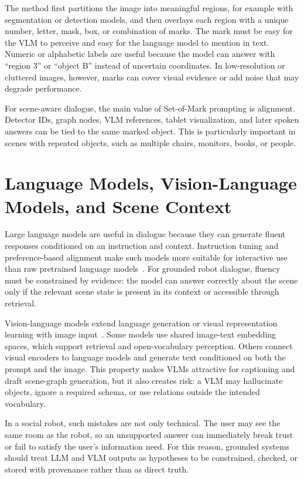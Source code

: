 The method first partitions the image into meaningful regions, for example with segmentation or detection models, and then overlays each region with a unique number, letter, mask, box, or combination of marks. The mark must be easy for the VLM to perceive and easy for the language model to mention in text. Numeric or alphabetic labels are useful because the model can answer with \enquote{region 3} or \enquote{object B} instead of uncertain coordinates. In low-resolution or cluttered images, however, marks can cover visual evidence or add noise that may degrade performance.

For scene-aware dialogue, the main value of Set-of-Mark prompting is alignment. Detector IDs, graph nodes, VLM references, tablet visualization, and later spoken answers can be tied to the same marked object. This is particularly important in scenes with repeated objects, such as multiple chairs, monitors, books, or people.

\section{Language Models, Vision-Language Models, and Scene Context}\label{sec:llms-vlms-context}

Large language models are useful in dialogue because they can generate fluent responses conditioned on an instruction and context. Instruction tuning and preference-based alignment make such models more suitable for interactive use than raw pretrained language models~\cite{ouyang2022traininglanguagemodelsfollow}. For grounded robot dialogue, fluency must be constrained by evidence: the model can answer correctly about the scene only if the relevant scene state is present in its context or accessible through retrieval.

Vision-language models extend language generation or visual representation learning with image input~\cite[2--3]{zhou_large_2026}. Some models use shared image-text embedding spaces, which support retrieval and open-vocabulary perception. Others connect visual encoders to language models and generate text conditioned on both the prompt and the image. This property makes VLMs attractive for captioning and draft scene-graph generation, but it also creates risk: a VLM may hallucinate objects, ignore a required schema, or use relations outside the intended vocabulary.

In a social robot, such mistakes are not only technical. The user may see the same room as the robot, so an unsupported answer can immediately break trust or fail to satisfy the user's information need. For this reason, grounded systems should treat LLM and VLM outputs as hypotheses to be constrained, checked, or stored with provenance rather than as direct truth.

